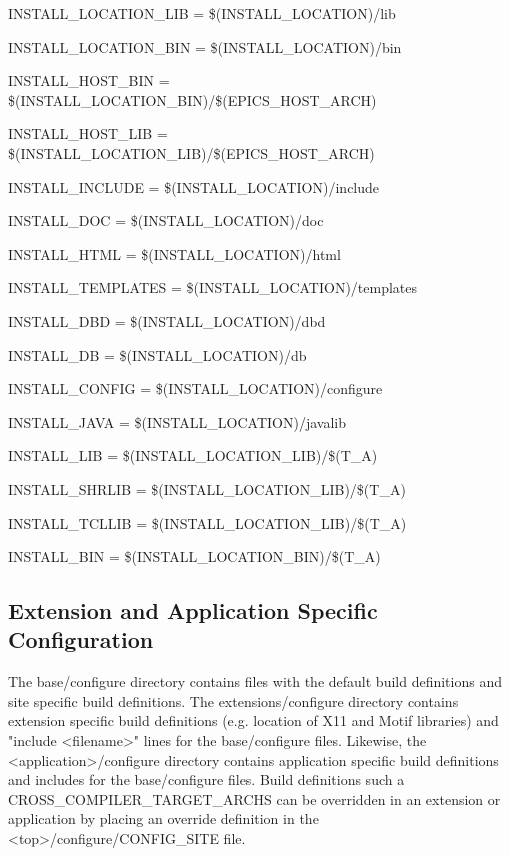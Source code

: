 INSTALL\_LOCATION\_LIB      = \$(INSTALL\_LOCATION)/lib

INSTALL\_LOCATION\_BIN      = \$(INSTALL\_LOCATION)/bin



INSTALL\_HOST\_BIN            = \$(INSTALL\_LOCATION\_BIN)/\$(EPICS\_HOST\_ARCH)

INSTALL\_HOST\_LIB            = \$(INSTALL\_LOCATION\_LIB)/\$(EPICS\_HOST\_ARCH)



INSTALL\_INCLUDE           = \$(INSTALL\_LOCATION)/include

INSTALL\_DOC               = \$(INSTALL\_LOCATION)/doc

INSTALL\_HTML              = \$(INSTALL\_LOCATION)/html

INSTALL\_TEMPLATES         = \$(INSTALL\_LOCATION)/templates

INSTALL\_DBD               = \$(INSTALL\_LOCATION)/dbd

INSTALL\_DB                = \$(INSTALL\_LOCATION)/db

INSTALL\_CONFIG            = \$(INSTALL\_LOCATION)/configure

INSTALL\_JAVA              = \$(INSTALL\_LOCATION)/javalib



INSTALL\_LIB               = \$(INSTALL\_LOCATION\_LIB)/\$(T\_A)

INSTALL\_SHRLIB            = \$(INSTALL\_LOCATION\_LIB)/\$(T\_A)

INSTALL\_TCLLIB            = \$(INSTALL\_LOCATION\_LIB)/\$(T\_A)

INSTALL\_BIN               = \$(INSTALL\_LOCATION\_BIN)/\$(T\_A)

\subsection{Extension and Application Specific Configuration}

The base/configure directory contains files with the default build definitions and site specific build definitions. The 
extensions/configure directory contains extension specific build definitions (e.g. location of X11 and Motif libraries) and 
"include \textless{}filename\textgreater{}" lines for the base/configure files. Likewise, the \textless{}application\textgreater{}/configure directory contains 
application specific build definitions and includes for the base/configure files. Build definitions such a 
CROSS\_COMPILER\_TARGET\_ARCHS can be overridden in an extension or application by placing an override 
definition in the \textless{}top\textgreater{}/configure/CONFIG\_SITE file.


